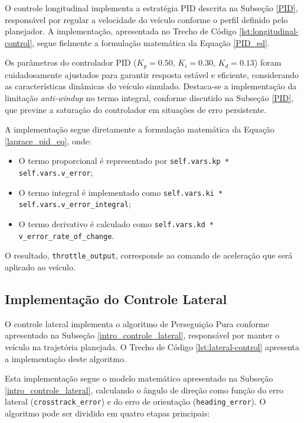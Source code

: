 O controle longitudinal implementa a estratégia PID descrita na Subseção \ref{PID}, responsável por regular a velocidade do veículo conforme o perfil definido pelo planejador. A implementação, apresentada no Trecho de Código \ref{lst:longitudinal-control}, segue fielmente a formulação matemática da Equação \ref{PID_ed}.

Os parâmetros do controlador PID ($K_p = 0.50$, $K_i = 0.30$, $K_d = 0.13$) foram cuidadosamente ajustados para garantir resposta estável e eficiente, considerando as características dinâmicas do veículo simulado. Destaca-se a implementação da limitação \textit{anti-windup} no termo integral, conforme discutido na Subseção \ref{PID}, que previne a saturação do controlador em situações de erro persistente.

A implementação segue diretamente a formulação matemática da Equação \ref{laprace_pid_eq}, onde:

\begin{itemize}
    \item O termo proporcional é representado por \texttt{self.vars.kp * self.vars.v\_error};
    \item O termo integral é implementado como \texttt{self.vars.ki * self.vars.v\_error\_integral};
    \item O termo derivativo é calculado como \texttt{self.vars.kd * v\_error\_rate\_of\_change}.
\end{itemize}

O resultado, \texttt{throttle\_output}, corresponde ao comando de aceleração que será aplicado ao veículo.

\subsection{Implementação do Controle Lateral} \label{subsec:pure_pursuit-implementaion}

O controle lateral implementa o algoritmo de Perseguição Pura conforme apresentado na Subseção \ref{intro_controle_lateral}, responsável por manter o veículo na trajetória planejada. O Trecho de Código \ref{lst:lateral-control} apresenta a implementação deste algoritmo.

Esta implementação segue o modelo matemático apresentado na Subseção \ref{intro_controle_lateral}, calculando o ângulo de direção como função do erro lateral (\texttt{crosstrack\_error}) e do erro de orientação (\texttt{heading\_error}). O algoritmo pode ser dividido em quatro etapas principais:

